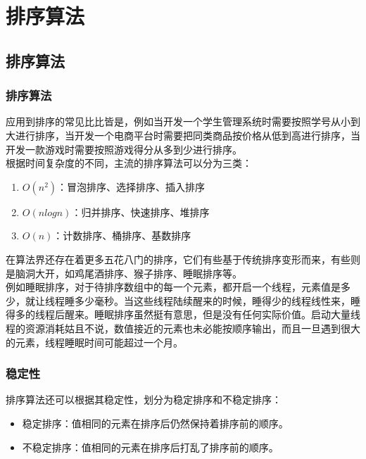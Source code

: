 \chapter{排序算法}

\section{排序算法}

\subsection{排序算法}

应用到排序的常见比比皆是，例如当开发一个学生管理系统时需要按照学号从小到大进行排序，当开发一个电商平台时需要把同类商品按价格从低到高进行排序，当开发一款游戏时需要按照游戏得分从多到少进行排序。\\

根据时间复杂度的不同，主流的排序算法可以分为三类：

\begin{enumerate}
	\item $ O(n^2) $：冒泡排序、选择排序、插入排序
	\item $ O(nlogn) $：归并排序、快速排序、堆排序
	\item $ O(n) $：计数排序、桶排序、基数排序
\end{enumerate}

在算法界还存在着更多五花八门的排序，它们有些基于传统排序变形而来，有些则是脑洞大开，如鸡尾酒排序、猴子排序、睡眠排序等。\\

例如睡眠排序，对于待排序数组中的每一个元素，都开启一个线程，元素值是多少，就让线程睡多少毫秒。当这些线程陆续醒来的时候，睡得少的线程线性来，睡得多的线程后醒来。睡眠排序虽然挺有意思，但是没有任何实际价值。启动大量线程的资源消耗姑且不说，数值接近的元素也未必能按顺序输出，而且一旦遇到很大的元素，线程睡眠时间可能超过一个月。\\

\subsection{稳定性}

排序算法还可以根据其稳定性，划分为稳定排序和不稳定排序：

\begin{itemize}
	\item 稳定排序：值相同的元素在排序后仍然保持着排序前的顺序。
	\item 不稳定排序：值相同的元素在排序后打乱了排序前的顺序。
\end{itemize}

